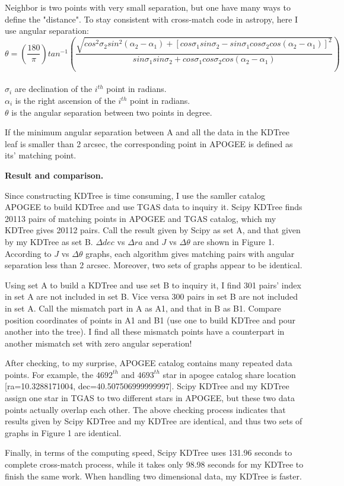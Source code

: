\documentclass{article}
\begin{document}
    Neighbor is two points with very small separation, but one have many ways to define the "distance". To stay consistent with cross-match code in astropy, here I use angular separation:
        $$\theta=\left(\dfrac{180}{\pi}\right)tan^{-1}\left(\dfrac{\sqrt{cos^2\sigma_2sin^2(\alpha_2-\alpha_1)+[cos\sigma_1sin\sigma_2-sin\sigma_1cos\sigma_2cos(\alpha_2-\alpha_1)]^2}}{sin\sigma_1sin\sigma_2+cos\sigma_1cos\sigma_2cos(\alpha_2-\alpha_1)}\right)$$\\
     $\sigma_i$ are declination of the $i^{th}$ point in radians. \\
     $\alpha_i$ is the right ascension of the $i^{th}$ point in radians. \\
     $\theta$ is the angular separation between two points in degree.\par
     If the minimum angular separation between A and all the data in the KDTree leaf is smaller than 2 arcsec, the corresponding point in APOGEE is defined as its' matching point.\par
	 
\vspace{12pt}
\textbf{Result and comparison.}\par
\vspace{12pt}
	Since constructing KDTree is time consuming, I use the samller catalog APOGEE to build KDTree and use TGAS data to inquiry it. Scipy KDTree finds 20113 pairs of matching points in APOGEE and TGAS catalog, which my KDTree gives 20112 pairs. Call the result given by Scipy as set A, and that given by my KDTree as set B. $\Delta dec$ vs $\Delta ra$ and $J$ vs $\Delta \theta$ are shown in Figure 1. According to $J$ vs $\Delta \theta$ graphs, each algorithm gives matching pairs with angular separation less than 2 arcsec. Moreover, two sets of graphs appear to be identical.\par
	Using set A to build a KDTree and use set B to inquiry it, I find 301 pairs' index in set A are not included in set B. Vice versa 300 pairs in set B are not included in set A. Call the mismatch part in A as A1, and that in B as B1. Compare position coordinates of points in A1 and B1 (use one to build KDTree and pour another into the tree). I find all these mismatch points have a counterpart in another mismatch set with zero angular seperation!\par
	After checking, to my surprise, APOGEE catalog contains many repeated data points. For example, the $4692^{th}$ and $4693^{th}$ star in apogee catalog share location [ra=10.3288171004, dec=40.507506999999997]. Scipy KDTree and my KDTree assign one star in TGAS to two different stars in APOGEE, but these two data points actually overlap each other. The above checking process indicates that results given by Scipy KDTree and my KDTree are identical, and thus two sets of graphs in Figure 1 are identical.\par
	Finally, in terms of the computing speed, Scipy KDTree uses 131.96 seconds to complete cross-match process, while it takes only 98.98 seconds for my KDTree to finish the same work. When handling two dimensional data, my KDTree is faster.\par
	
\end{document}
